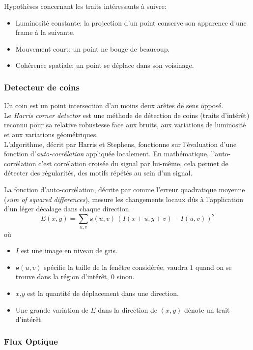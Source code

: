 \documentclass[a4paper,12pt]{report}
\begin{document}
Hypothèses concernant les traits intéressants à suivre:
\begin{itemize}
\item Luminosité constante: la projection d'un point conserve son apparence d'une frame à la suivante.
\item Mouvement court: un point ne bouge de beaucoup.
\item Cohérence spatiale: un point se déplace dans son voisinage.
\end{itemize}

\subsubsection{Detecteur de coins}
Un coin est un point intersection d'au moins deux arêtes de sens opposé.\\

Le \textit{Harris corner detector} est une méthode de détection de coins (traits d'intérêt) reconnu pour sa relative robustesse face aux bruits, aux variations de luminosité et aux variations géométriques. \\

L'algorithme, décrit par Harris et Stephens, fonctionne sur l'évaluation d'une fonction d'\textit{auto-corrélation} appliquée localement. 
En mathématique, l'auto-corrélation c'est corrélation croisée du signal par lui-même, cela permet de détecter des régularités, des motifs répétés au sein d'un signal.   

La fonction d'auto-corrélation, décrite par \cite{q} comme l'erreur quadratique moyenne (\textit{sum of squared differences}), mesure les changements locaux dûs à l'application d'un léger décalage dans chaque direction.\\
$$
E(x,y) = \sum_{u,v} \texttt{w}(u,v) \, \left( I(x+u,y+v) - I(u,v)\right)^2
$$
où
\begin{itemize}
\item[]$I$ est une image en niveau de gris.
\item[]$\texttt{w}(u,v)$ spécifie la taille de la fenêtre considérée, vaudra $1$ quand on se trouve dans la région d'intérêt, $0$ sinon.
\item[]$x$,$y$ est la quantité de déplacement dans une direction.
\item[]Une grande variation de $E$ dans la direction de $(x,y)$ dénote un trait d'intérêt.
\end{itemize}

\subsubsection{Flux Optique}
\end{document}
